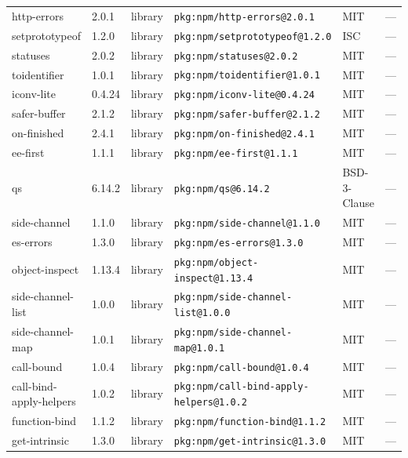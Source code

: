 \documentclass[11pt,a4paper]{article}
\begin{document}
\begin{longtable}{|p{4cm}|p{2cm}|p{1.6cm}|p{5cm}|p{1.5cm}|p{3.5cm}|}
\raggedright http-errors & 2.0.1 & library & \small\texttt{pkg:npm/http-errors@2.0.1} & MIT & \small — \\
\raggedright setprototypeof & 1.2.0 & library & \small\texttt{pkg:npm/setprototypeof@1.2.0} & ISC & \small — \\
\raggedright statuses & 2.0.2 & library & \small\texttt{pkg:npm/statuses@2.0.2} & MIT & \small — \\
\raggedright toidentifier & 1.0.1 & library & \small\texttt{pkg:npm/toidentifier@1.0.1} & MIT & \small — \\
\raggedright iconv-lite & 0.4.24 & library & \small\texttt{pkg:npm/iconv-lite@0.4.24} & MIT & \small — \\
\raggedright safer-buffer & 2.1.2 & library & \small\texttt{pkg:npm/safer-buffer@2.1.2} & MIT & \small — \\
\raggedright on-finished & 2.4.1 & library & \small\texttt{pkg:npm/on-finished@2.4.1} & MIT & \small — \\
\raggedright ee-first & 1.1.1 & library & \small\texttt{pkg:npm/ee-first@1.1.1} & MIT & \small — \\
\raggedright qs & 6.14.2 & library & \small\texttt{pkg:npm/qs@6.14.2} & BSD-3-Clause & \small — \\
\raggedright side-channel & 1.1.0 & library & \small\texttt{pkg:npm/side-channel@1.1.0} & MIT & \small — \\
\raggedright es-errors & 1.3.0 & library & \small\texttt{pkg:npm/es-errors@1.3.0} & MIT & \small — \\
\raggedright object-inspect & 1.13.4 & library & \small\texttt{pkg:npm/object-inspect@1.13.4} & MIT & \small — \\
\raggedright side-channel-list & 1.0.0 & library & \small\texttt{pkg:npm/side-channel-list@1.0.0} & MIT & \small — \\
\raggedright side-channel-map & 1.0.1 & library & \small\texttt{pkg:npm/side-channel-map@1.0.1} & MIT & \small — \\
\raggedright call-bound & 1.0.4 & library & \small\texttt{pkg:npm/call-bound@1.0.4} & MIT & \small — \\
\raggedright call-bind-apply-helpers & 1.0.2 & library & \small\texttt{pkg:npm/call-bind-apply-helpers@1.0.2} & MIT & \small — \\
\raggedright function-bind & 1.1.2 & library & \small\texttt{pkg:npm/function-bind@1.1.2} & MIT & \small — \\
\raggedright get-intrinsic & 1.3.0 & library & \small\texttt{pkg:npm/get-intrinsic@1.3.0} & MIT & \small — \\

\end{longtable}
\end{document}
